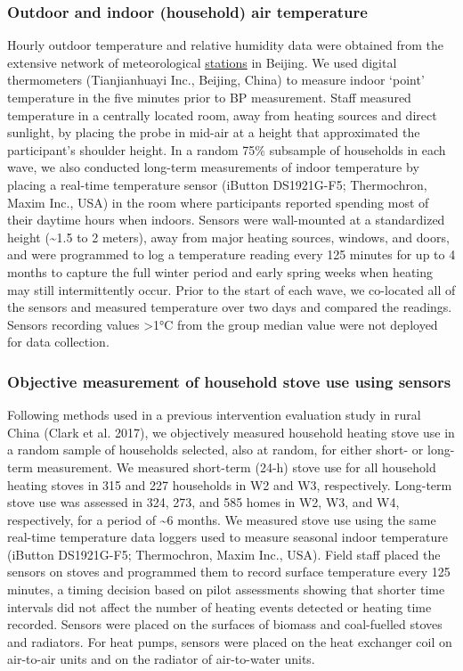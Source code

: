 \documentclass[
  letterpaper,
  DIV=11,
  numbers=noendperiod]{scrartcl}
\begin{document}
\subsubsection{Outdoor and indoor (household) air
temperature}\label{outdoor-and-indoor-household-air-temperature}

Hourly outdoor temperature and relative humidity data were obtained from
the extensive network of meteorological
\href{http://beijingair.sinaapp.com}{stations} in Beijing. We used
digital thermometers (Tianjianhuayi Inc., Beijing, China) to measure
indoor `point' temperature in the five minutes prior to BP measurement.
Staff measured temperature in a centrally located room, away from
heating sources and direct sunlight, by placing the probe in mid-air at
a height that approximated the participant's shoulder height. In a
random 75\% subsample of households in each wave, we also conducted
long-term measurements of indoor temperature by placing a real-time
temperature sensor (iButton DS1921G-F5; Thermochron, Maxim Inc., USA) in
the room where participants reported spending most of their daytime
hours when indoors. Sensors were wall-mounted at a standardized height
(\textasciitilde1.5 to 2 meters), away from major heating sources,
windows, and doors, and were programmed to log a temperature reading
every 125 minutes for up to 4 months to capture the full winter period
and early spring weeks when heating may still intermittently occur.
Prior to the start of each wave, we co-located all of the sensors and
measured temperature over two days and compared the readings. Sensors
recording values \textgreater1°C from the group median value were not
deployed for data collection.

\subsubsection{Objective measurement of household stove use using
sensors}\label{objective-measurement-of-household-stove-use-using-sensors}

Following methods used in a previous intervention evaluation study in
rural China (Clark et al. 2017), we objectively measured household
heating stove use in a random sample of households selected, also at
random, for either short- or long-term measurement. We measured
short-term (24-h) stove use for all household heating stoves in 315 and
227 households in W2 and W3, respectively. Long-term stove use was
assessed in 324, 273, and 585 homes in W2, W3, and W4, respectively, for
a period of \textasciitilde6 months. We measured stove use using the
same real-time temperature data loggers used to measure seasonal indoor
temperature (iButton DS1921G-F5; Thermochron, Maxim Inc., USA). Field
staff placed the sensors on stoves and programmed them to record surface
temperature every 125 minutes, a timing decision based on pilot
assessments showing that shorter time intervals did not affect the
number of heating events detected or heating time recorded. Sensors were
placed on the surfaces of biomass and coal-fuelled stoves and radiators.
For heat pumps, sensors were placed on the heat exchanger coil on
air-to-air units and on the radiator of air-to-water units.
\end{document}
